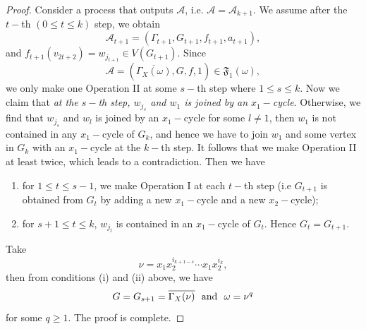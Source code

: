\documentclass{amsart}
\theoremstyle{plain}
\theoremstyle{definition}
\theoremstyle{remark}
\begin{document}
\begin{proof}
     Consider a process that outputs $\mathcal{A}$, i.e. $\mathcal{A}=\mathcal{A}_{k+1}$. 
     We assume after the $t-$th $(0\leq t\leq k)$ step, we obtain $$\mathcal{A}_{t+1}=(\Gamma_{t+1},G_{t+1},f_{t+1},a_{t+1}),$$
    and $f_{t+1}(v_{2t+2})=w_{j_{t+1}}\in V(G_{t+1})$.
     Since $$\mathcal{A}=\left(\overline{\Gamma_X(\omega)},G,f,1\right)\in\mathfrak{F}_1(\omega),$$ we only make one Operation II at some $s-$th step where $1\leq s\leq k$. Now we claim that \emph{at the $s-$th step, $w_{j_s}$ and $w_1$ is joined by an $x_1-$cycle}. Otherwise, we find that $w_{j_s}$ and $w_l$ is joined by an $x_1-$cycle for some $l\neq 1$, then $w_1$ is not contained in any $x_1-$cycle of $G_k$, and hence we have to join $w_1$ and some vertex in $G_k$ with an $x_1-$cycle at the $k-$th step. It follows that we make Operation II at least twice, which leads to a contradiction. Then we have 
    \begin{enumerate}
        \item for $1\leq t\leq s-1$, we make Operation I at each $t-$th step (i.e $G_{t+1}$ is obtained from $G_t$ by adding a new $x_1-$cycle and a new $x_2-$cycle);
        \item for $s+1\leq t\leq k$, $w_{j_{t}}$ is contained in an $x_1-$cycle of $G_{t}$. Hence $G_t=G_{t+1}$.
    \end{enumerate}
    Take $$\nu=x_1x_2^{i_{k+1-s}}\cdots x_1x_2^{i_k},$$ then from conditions (i) and (ii) above, we have $$G=G_{s+1}=\overline{\Gamma_X(\nu)} \textnormal{ \ and \ } \omega=\nu^q$$ for some $q\geq 1$. The proof is complete.
\end{proof}
\end{document}
